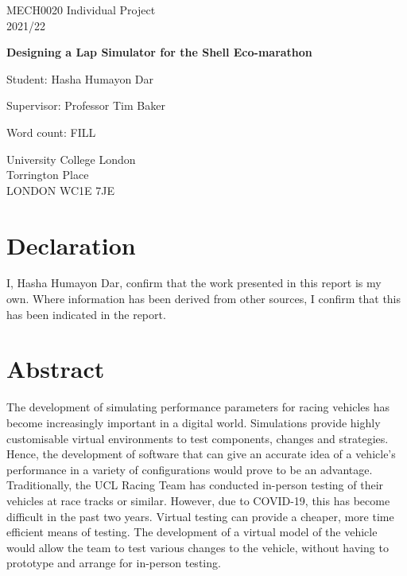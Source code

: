 \documentclass[11pt]{article}
\numberwithin{equation}{section}
\begin{document}
\begin{titlepage}
    \begin{center}
        \vspace*{1cm}
             
        MECH0020 Individual Project\\
        2021/22
 
        \vspace{1.5cm}

        {\LARGE \textbf{Designing a Lap Simulator for the Shell Eco-marathon} \par}
             
        \vspace{1.5cm}
 
        Student: Hasha Humayon Dar
        
        \vspace{0.25cm}

        Supervisor: Professor Tim Baker

        \vspace{0.25cm}

        Word count: FILL
        
        \vfill

        University College London\\
        Torrington Place\\
        LONDON WC1E 7JE
             
    \end{center}
 \end{titlepage}
\newpage
\section*{Declaration}
I, Hasha Humayon Dar, confirm that the work presented in this report is my own. Where information has been derived from other sources, I confirm that this has been indicated in the report.
\section*{Abstract}
The development of simulating performance parameters for racing vehicles has become increasingly important in a digital world. Simulations provide highly customisable virtual environments to test components, changes and strategies. Hence, the development of software that can give an accurate idea of a vehicle's performance in a variety of configurations would prove to be an advantage. Traditionally, the UCL Racing Team has conducted in-person testing of their vehicles at race tracks or similar. However, due to COVID-19, this has become difficult in the past two years. Virtual testing can provide a cheaper, more time efficient means of testing. The development of a virtual model of the vehicle would allow the team to test various changes to the vehicle, without having to prototype and arrange for in-person testing. 
\end{document}
